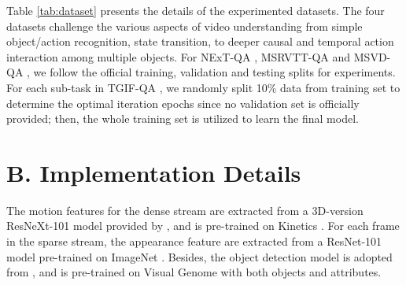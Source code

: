 \documentclass[letterpaper]{article} \usepackage{aaai21}  \usepackage{times}  \usepackage{helvet} \usepackage{courier}  \usepackage[hyphens]{url}  \usepackage{graphicx} \urlstyle{rm} \def\UrlFont{\rm}  \usepackage{natbib}  \usepackage{caption} \usepackage{color, colortbl}
\begin{document}
Table \ref{tab:dataset} presents the details of the experimented datasets. The four datasets challenge the various aspects of video understanding from simple object/action recognition, state transition, to deeper causal and temporal action interaction among multiple objects. For NExT-QA \cite{xiao2021next}, MSRVTT-QA \cite{xu2017video} and MSVD-QA \cite{xu2017video}, we follow the official training, validation and testing splits for experiments. For each sub-task in TGIF-QA \cite{jang2017}, we randomly split 10\% data from training set to determine the optimal iteration epochs since no validation set is officially provided; then, the whole training set is utilized to learn the final model. 

\begin{table*}[t!]
\small
\centering
\begin{threeparttable}
\caption{Model efficiency of HQGA. GPU: Tesla V100. Batch size: 64. M: Minutes per epoch. Time of feature extraction is not considered. The model size varies a bit on open-ended QA datasets as the number of answers (categories) are different.}
\label{tab:model}
\end{threeparttable}
\end{table*}

\section{B. Implementation Details}
The motion features  for the dense stream are extracted from a 3D-version ResNeXt-101 model provided by \cite{hara2018can}, and is pre-trained on Kinetics \cite{kay2017kinetics}. For each frame in the sparse stream, the appearance feature  are extracted from a ResNet-101 \cite{he2016deep} model pre-trained on ImageNet \cite{deng2009imagenet}. Besides, the object detection model is adopted from \cite{anderson2018bottom}, and is pre-trained on Visual Genome \cite{krishna2017visual} with both objects and attributes. 
\end{document}
